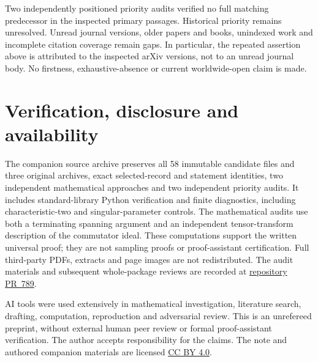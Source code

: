 \documentclass[11pt]{article}
\begin{document}
Two independently positioned priority audits verified no full matching
predecessor in the inspected primary passages. Historical priority
remains unresolved. Unread journal versions, older papers and books,
unindexed work and incomplete citation coverage remain gaps.
In particular, the repeated assertion above is attributed to the
inspected arXiv versions, not to an unread journal body.
No firstness, exhaustive-absence or current worldwide-open claim
is made.

\section*{Verification, disclosure and availability}
The companion source archive preserves all 58 immutable candidate files
and three original archives, exact selected-record and statement
identities, two independent mathematical approaches and two independent
priority audits. It includes standard-library Python verification and
finite diagnostics, including characteristic-two and singular-parameter
controls. The mathematical audits use both a terminating spanning
argument and an independent tensor-transform description of the
commutator ideal. These computations support the written universal
proof; they are not sampling proofs or proof-assistant certification.
Full third-party PDFs, extracts and page images are not redistributed.
The audit materials and subsequent whole-package reviews are recorded
at \href{https://github.com/AlecKriebel/Math/pull/789}{repository PR~789}.

AI tools were used extensively in mathematical investigation,
literature search, drafting, computation, reproduction and adversarial
review. This is an unrefereed preprint, without external human peer
review or formal proof-assistant verification.
The author accepts responsibility for the claims.
The note and authored companion materials are licensed
\href{https://creativecommons.org/licenses/by/4.0/}{CC BY 4.0}.
\end{document}
